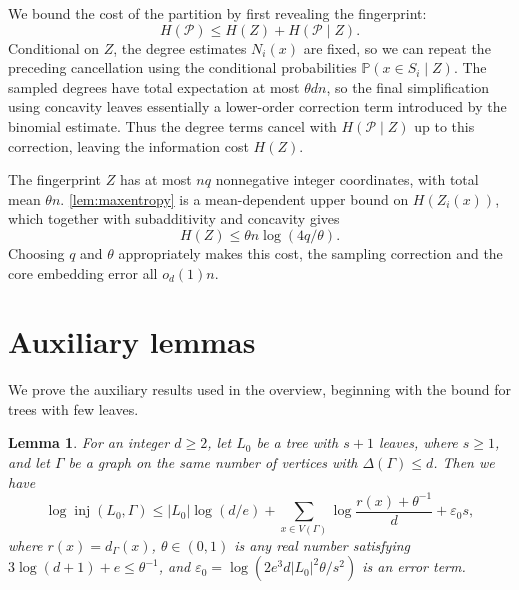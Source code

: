 \documentclass[reqno,final,a4paper]{amsart}
\numberwithin{equation}{section}
\newtheorem{lemma}[theorem]{Lemma}
\theoremstyle{definition}
\theoremstyle{remark}
\DeclareMathOperator{\inj}{inj}
\begin{document}
We bound the cost of the partition by first revealing the fingerprint:
\[
    H(\mathcal P)\leq H(Z)+H(\mathcal P\mid Z).
\]
Conditional on $Z$, the degree estimates $N_i(x)$ are fixed, so we can repeat
the preceding cancellation using the conditional probabilities
$\mathbb P(x\in S_i\mid Z)$.
The sampled degrees have total expectation at most $\theta dn$,
so the final simplification using concavity leaves essentially a lower-order correction term introduced
by the binomial estimate.
Thus the degree terms cancel with $H(\mathcal P\mid Z)$ up to this
correction, leaving the information cost $H(Z)$.

The fingerprint $Z$ has at most $nq$ nonnegative integer coordinates, with total mean $\theta n$.  \cref{lem:maxentropy} is a mean-dependent upper bound on $H(Z_i(x))$, which together with subadditivity and concavity gives
\[H(Z)\leq \theta n\log(4q/\theta).\]
Choosing $q$ and $\theta$ appropriately makes this cost, the sampling correction and the core embedding error all $o_d(1)n$.

\section{Auxiliary lemmas}
    \label{sec:auxiliary}
We prove the auxiliary results used in the overview, beginning with the bound for trees with few leaves.

\begin{lemma}\label{lem:core-embeddings}
For an integer $d\ge2$, let $L_0$ be a tree with $s+1$ leaves,
where $s\ge1$, and let $\Gamma$ be a graph on the same number
of vertices with $\Delta(\Gamma)\le d$. Then we have
\[
 \log\inj(L_0,\Gamma)
 \le |L_0|\log(d/e)
 +\sum_{x\in V(\Gamma)}\log\frac{r(x)+\theta^{-1}}{d}
 +\varepsilon_0 s,
\]
where $r(x)=d_\Gamma(x)$, $\theta\in(0,1)$ is any real number
satisfying $3\log(d+1)+e\le\theta^{-1}$, and $\varepsilon_0=
 \log(2e^3d|L_0|^2\theta/s^2)$ is an error term.
\end{lemma}
\end{document}
